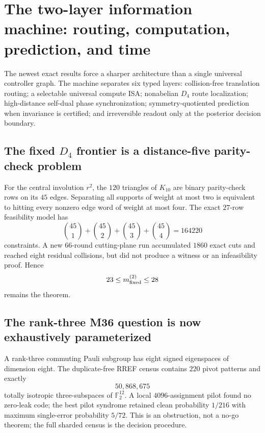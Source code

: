 \section{The two-layer information machine: routing, computation, prediction, and time}
\label{sec:bt3124-3132}

The newest exact results force a sharper architecture than a single universal controller graph.
The machine separates six typed layers: collision-free translation routing; a selectable
universal compute ISA; nonabelian $D_4$ route localization; high-distance self-dual phase
synchronization; symmetry-quotiented prediction when invariance is certified; and irreversible
readout only at the posterior decision boundary.

\subsection{The fixed $D_4$ frontier is a distance-five parity-check problem}
For the central involution $r^2$, the $120$ triangles of $K_{10}$ are binary parity-check
rows on its $45$ edges.  Separating all supports of weight at most two is equivalent to
hitting every nonzero edge word of weight at most four.  The exact $27$-row feasibility
model has
\[
 {45\choose1}+{45\choose2}+{45\choose3}+{45\choose4}=164220
\]
constraints.  A new $66$-round cutting-plane run accumulated $1860$ exact cuts and reached
eight residual collisions, but did not produce a witness or an infeasibility proof.  Hence
\[
 23\le m_{\rm fixed}^{(2)}\le 28
\]
remains the theorem.

\subsection{The rank-three M36 question is now exhaustively parameterized}
A rank-three commuting Pauli subgroup has eight signed eigenspaces of dimension eight.  The
duplicate-free RREF census contains $220$ pivot patterns and exactly
\[
 50{,}868{,}675
\]
totally isotropic three-subspaces of $\mathbb F_2^{12}$.  A local $4096$-assignment pilot
found no zero-leak code; the best pilot syndrome retained clean probability $1/216$ with
maximum single-error probability $5/72$.  This is an obstruction, not a no-go theorem; the
full sharded census is the decision procedure.


